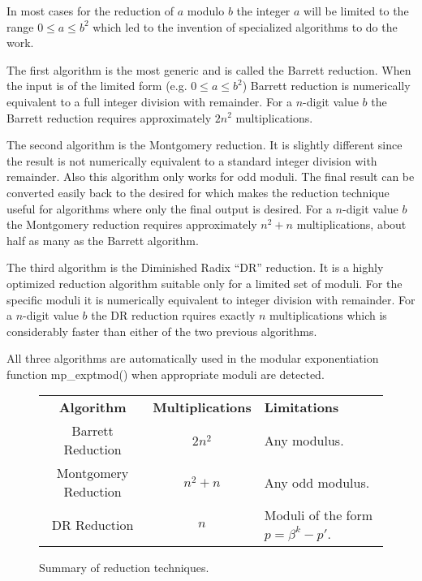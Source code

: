\documentclass[]{article}
\begin{document}
In most cases for the reduction of $a$ modulo $b$ the integer $a$ will be limited to the range 
$0 \le a \le b^2$ which led to the invention of specialized algorithms to do the work.

The first algorithm is the most generic and is called the Barrett reduction.  When the input is of the 
limited form (e.g. $0 \le a \le b^2$) Barrett reduction is numerically equivalent to a full integer
division with remainder.  For a $n$-digit value $b$ the Barrett reduction requires approximately $2n^2$
multiplications.

The second algorithm is the Montgomery reduction.  It is slightly different since the result is not
numerically equivalent to a standard integer division with remainder.  Also this algorithm only works for
odd moduli.  The final result can be converted easily back to the desired for which makes the reduction 
technique useful for algorithms where only the final output is desired.  For a $n$-digit value $b$ the 
Montgomery reduction requires approximately $n^2 + n$ multiplications, about half as many as the 
Barrett algorithm.  

The third algorithm is the Diminished Radix ``DR'' reduction.  It is a highly optimized reduction algorithm
suitable only for a limited set of moduli.  For the specific moduli it is numerically equivalent to
integer division with remainder.  For a $n$-digit value $b$ the DR reduction rquires exactly $n$
multiplications which is considerably faster than either of the two previous algorithms.

All three algorithms are automatically used in the modular exponentiation function mp\_exptmod() when 
appropriate moduli are detected.

\begin{figure}[here]
\begin{small}
\begin{center}
\begin{tabular}{|c|c|l|}
\hline \textbf{Algorithm} & \textbf{Multiplications} & \textbf{Limitations} \\
 Barrett Reduction  & $2n^2$ & Any modulus. \\
 Montgomery Reduction & $n^2 + n$ & Any odd modulus. \\
 DR Reduction & $n$ & Moduli of the form  $p = \beta^k - p'$.\\
\hline
\end{tabular}
\caption{Summary of reduction techniques.}
\end{center}
\end{small}
\end{figure}
\end{document}
